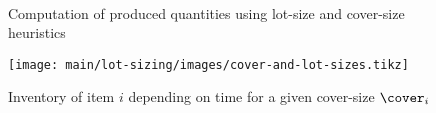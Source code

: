 




\begin{figure}[h]
  \centering
  \\
  \caption{Computation of produced quantities using lot-size and cover-size heuristics}
  \label{fig:lot-and-cover-size-heuristics}
\end{figure}


\begin{figure}[h]
  \centering
  \texttt{[image: main/lot-sizing/images/cover-and-lot-sizes.tikz]}
  \caption{Inventory of item $i$ depending on time for a given cover-size $\cover_i$}
  \label{fig:cover-size-item-i}
\end{figure}

